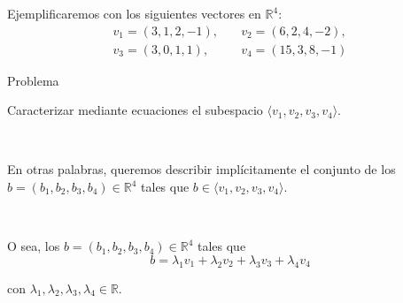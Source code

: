 \documentclass[handout]{beamer} %
\newcommand{\R}{\mathbb R}
\begin{document}
    
    \begin{frame}
    Ejemplificaremos con los siguientes vectores en $\R^4$:
    \begin{align*}
    v_1=(3,1,2,-1),&\quad
    v_2=(6,2,4,-2),\\
    v_3=(3,0,1,1),&\quad
    v_4=(15,3,8,-1)
    \end{align*}
    \pause

    \begin{exampleblock}{Problema}\pause
    
    Caracterizar mediante ecuaciones el subespacio $\langle v_1, v_2, v_3, v_4\rangle$.
    
    \pause
    
    \
    
    En otras palabras, queremos describir implícitamente el conjunto de los $b=(b_1,b_2,b_3,b_4)
    \in\R^4$ tales que $b\in\langle v_1, v_2, v_3, v_4\rangle$.
    
    \

    \pause
    O sea, los $b=(b_1,b_2,b_3,b_4)
    \in\R^4$ tales que 
    \begin{equation*}
        b=\lambda_1v_1+\lambda_2v_2+\lambda_3v_3+\lambda_4v_4 \tag{*}
    \end{equation*}
    
    
    con $\lambda_1,\lambda_2,\lambda_3,\lambda_4\in\R$.
    \end{exampleblock}
    \end{frame}
    
\end{document}
